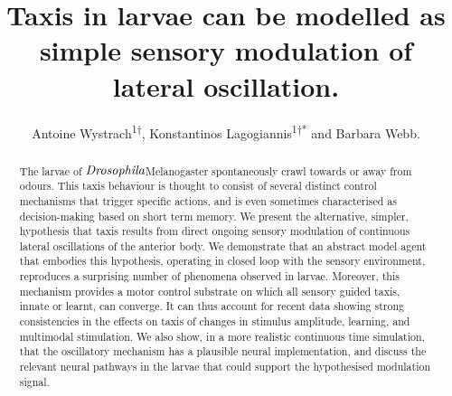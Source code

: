 \documentclass[10pt,a4paper]{article}
\author{Antoine Wystrach\textsuperscript{1†}, Konstantinos Lagogiannis\textsuperscript{1†*} and Barbara Webb.}
\title{Taxis in \Dros larvae can be modelled as simple sensory modulation of lateral oscillation.}
\newcommand{\Dros }{$\mathrm{\emph{Drosophila}}$}
\begin{document}
\maketitle
\begin{abstract}
The larvae of \Dros  Melanogaster spontaneously crawl towards or away from odours. This taxis behaviour is thought to consist of several distinct control mechanisms that trigger specific actions, and is even sometimes characterised as decision-making based on short term memory. We present the alternative, simpler, hypothesis that taxis results from direct ongoing sensory modulation of continuous lateral oscillations of the anterior body. We demonstrate that an abstract model agent that embodies this hypothesis, operating in closed loop with the sensory environment, reproduces a surprising number of phenomena observed in larvae. Moreover, this mechanism provides a motor control substrate on which all sensory guided taxis, innate or learnt, can converge. It can thus account for recent data showing strong consistencies in the effects on taxis of changes in stimulus amplitude, learning, and multimodal stimulation. We also show, in a more realistic continuous time simulation, that the oscillatory mechanism has a plausible neural implementation, and discuss the relevant neural pathways in the larvae that could support the hypothesised modulation signal.
\end{abstract}
\end{document}
